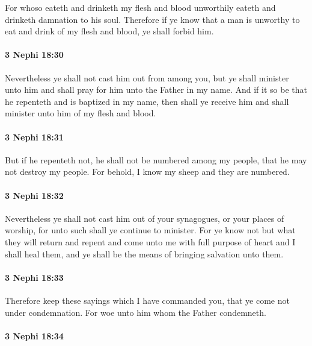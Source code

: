 			For whoso eateth and drinketh my flesh and blood unworthily
			eateth and drinketh damnation to his soul.
			Therefore if ye know that a man is unworthy
			to eat and drink of my flesh and blood,
			ye shall forbid him.

		\paragraph{3 Nephi 18:30} %
			\label{3NEPHI-18-30}

			Nevertheless ye shall not cast him out from among you,
			but ye shall minister unto him
			and shall pray for him unto the Father in my name.
			And if it so be that he repenteth and is baptized in my name,
			then shall ye receive him
			and shall minister unto him of my flesh and blood.

		\paragraph{3 Nephi 18:31} %
			\label{3NEPHI-18-31}

			But if he repenteth not,
			he shall not be numbered among my people,
			that he may not destroy my people.
			For behold, I know my sheep and they are numbered.

		\paragraph{3 Nephi 18:32} %
			\label{3NEPHI-18-32}

			Nevertheless ye shall not cast him out of your synagogues,
			or your places of worship,
			for unto such shall ye continue to minister.
			For ye know not but what they will return and repent
			and come unto me with full purpose of heart
			and I shall heal them,
			and ye shall be the means of bringing salvation unto them.

		\paragraph{3 Nephi 18:33} %
			\label{3NEPHI-18-33}

			Therefore keep these sayings which I have commanded you,
			that ye come not under condemnation.
			For woe unto him whom the Father condemneth.

		\paragraph{3 Nephi 18:34} %
			\label{3NEPHI-18-34}

